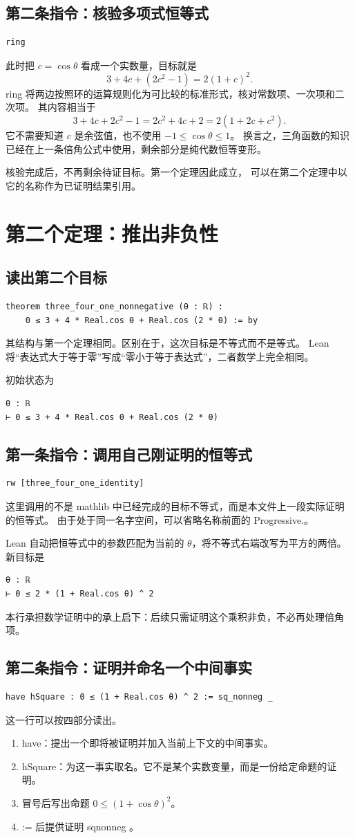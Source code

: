 \documentclass[UTF8,fontset=fandol,a4paper,11pt]{ctexart}
\newcommand{\code}[1]{{\small\ttfamily\def\_{\textunderscore\allowbreak}#1}}
\newcommand{\step}[1]{\Needspace{7\baselineskip}\subsection{#1}}
\begin{document}
\step{第二条指令：核验多项式恒等式}
\begin{Verbatim}
ring
\end{Verbatim}
此时把 $c=\cos\theta$ 看成一个实数量，目标就是
\[
  3+4c+(2c^2-1)=2(1+c)^2.
\]
\code{ring} 将两边按照环的运算规则化为可比较的标准形式，核对常数项、一次项和二次项。
其内容相当于
\[
  3+4c+2c^2-1=2c^2+4c+2
  =2(1+2c+c^2).
\]
它不需要知道 $c$ 是余弦值，也不使用 $-1\le\cos\theta\le1$。
换言之，三角函数的知识已经在上一条倍角公式中使用，剩余部分是纯代数恒等变形。

核验完成后，不再剩余待证目标。第一个定理因此成立，
可以在第二个定理中以它的名称作为已证明结果引用。

\section{第二个定理：推出非负性}

\step{读出第二个目标}
\begin{Verbatim}
theorem three_four_one_nonnegative (θ : ℝ) :
    0 ≤ 3 + 4 * Real.cos θ + Real.cos (2 * θ) := by
\end{Verbatim}
其结构与第一个定理相同。区别在于，这次目标是不等式而不是等式。
Lean 将“表达式大于等于零”写成“零小于等于表达式”，二者数学上完全相同。

初始状态为
\begin{Verbatim}
θ : ℝ
⊢ 0 ≤ 3 + 4 * Real.cos θ + Real.cos (2 * θ)
\end{Verbatim}

\step{第一条指令：调用自己刚证明的恒等式}
\begin{Verbatim}
rw [three_four_one_identity]
\end{Verbatim}
这里调用的不是 mathlib 中已经完成的目标不等式，而是本文件上一段实际证明的恒等式。
由于处于同一名字空间，可以省略名称前面的 \code{Progressive.}。

Lean 自动把恒等式中的参数匹配为当前的 $\theta$，将不等式右端改写为平方的两倍。
新目标是
\begin{Verbatim}
θ : ℝ
⊢ 0 ≤ 2 * (1 + Real.cos θ) ^ 2
\end{Verbatim}
本行承担数学证明中的承上启下：后续只需证明这个乘积非负，不必再处理倍角项。

\step{第二条指令：证明并命名一个中间事实}
\begin{Verbatim}
have hSquare : 0 ≤ (1 + Real.cos θ) ^ 2 := sq_nonneg _
\end{Verbatim}
这一行可以按四部分读出。
\begin{enumerate}
  \item \code{have}：提出一个即将被证明并加入当前上下文的中间事实。
  \item \code{hSquare}：为这一事实取名。它不是某个实数变量，而是一份给定命题的证明。
  \item 冒号后写出命题 $0\le(1+\cos\theta)^2$。
  \item \code{:=} 后提供证明 \code{sq\_nonneg \_}。
\end{enumerate}
\end{document}
